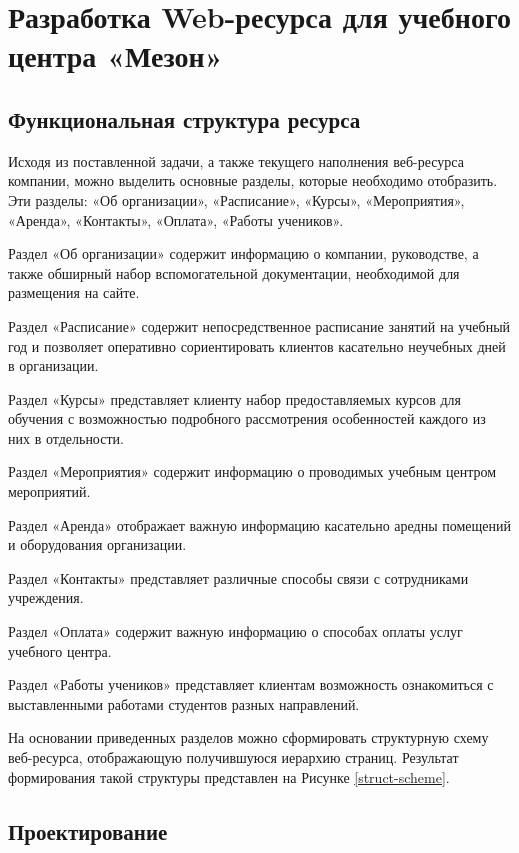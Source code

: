 \section{Разработка Web-ресурса для учебного центра «Мезон»}


\subsection{Функциональная структура ресурса}




Исходя из поставленной задачи, а также текущего наполнения веб-ресурса компании, можно выделить основные разделы, которые необходимо отобразить.
Эти разделы: «Об организации», «Расписание», «Курсы», «Мероприятия», «Аренда», «Контакты», «Оплата», «Работы учеников».

Раздел «Об организации» содержит информацию о компании, руководстве, а также обширный набор вспомогательной документации, необходимой для размещения на сайте.

Раздел «Расписание» содержит непосредственное расписание занятий на учебный год и позволяет оперативно сориентировать клиентов касательно неучебных дней в организации.

Раздел «Курсы» представляет клиенту набор предоставляемых курсов для обучения с возможностью подробного рассмотрения особенностей каждого из них в отдельности.

Раздел «Мероприятия» содержит информацию о проводимых учебным центром мероприятий.

Раздел «Аренда» отображает важную информацию касательно аредны помещений и оборудования организации.

Раздел «Контакты» представляет различные способы связи с сотрудниками учреждения.

Раздел «Оплата» содержит важную информацию о способах оплаты услуг учебного центра.

Раздел «Работы учеников» представляет клиентам возможность ознакомиться с выставленными работами студентов разных направлений.

На основании приведенных разделов можно сформировать структурную схему веб-ресурса, отображающую получившуюся иерархию страниц.
Результат формирования такой структуры представлен на Рисунке \ref{struct-scheme}.



\subsection{Проектирование }



\clearpage
